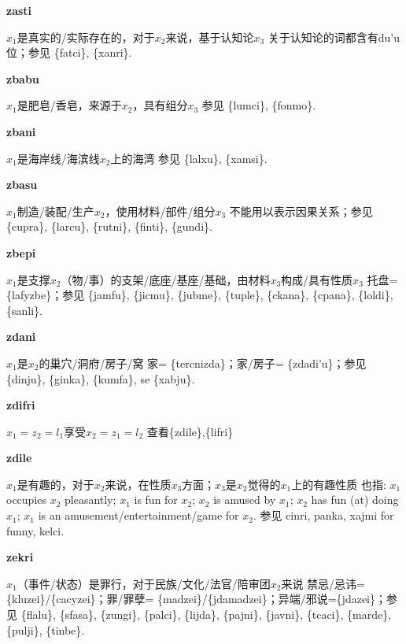 \documentclass[notitlepage,twocolumn,a4paper,10pt]{book}
\begin{document}
{\sffamily\bfseries zasti}\enspace {\ttfamily\bfseries[zat     za'i]}  $x_1$是真实的\slash{}实际存在的，对于$x_2$来说，基于认知论$x_3$ \textemdash{} 关于认知论的词都含有du'u位；参见 \{fatci\}, \{xanri\}.

{\sffamily\bfseries zbabu}\enspace {\ttfamily\bfseries[bab]}  $x_1$是肥皂\slash{}香皂，来源于$x_2$，具有组分$x_3$ \textemdash{} 参见 \{lumci\}, \{fonmo\}.

{\sffamily\bfseries zbani} $x_1$是海岸线\slash{}海滨线$x_2$上的海湾 \textemdash{} 参见 \{lalxu\}, \{xamsi\}.

{\sffamily\bfseries zbasu}\enspace {\ttfamily\bfseries[    zba]}  $x_1$制造\slash{}装配\slash{}生产$x_2$，使用材料\slash{}部件\slash{}组分$x_3$ \textemdash{} 不能用以表示因果关系；参见 \{cupra\}, \{larcu\}, \{rutni\}, \{finti\}, \{gundi\}.

{\sffamily\bfseries zbepi}\enspace {\ttfamily\bfseries[    zbe]}  $x_1$是支撑$x_2$（物\slash{}事）的支架\slash{}底座\slash{}基座\slash{}基础，由材料$x_3$构成\slash{}具有性质$x_3$ \textemdash{} 托盘= \{lafyzbe\}；参见 \{jamfu\}, \{jicmu\}, \{jubme\}, \{tuple\}, \{ckana\}, \{cpana\}, \{loldi\}, \{sanli\}.

{\sffamily\bfseries zdani}\enspace {\ttfamily\bfseries[    zda]}  $x_1$是$x_2$的巢穴\slash{}洞府\slash{}房子\slash{}窝 \textemdash{} 家= \{tercnizda\}；家\slash{}房子= \{zdadi'u\}；参见 \{dinju\}, \{ginka\}, \{kumfa\}, se \{xabju\}.

{\sffamily\bfseries zdifri} $x_1=z_2=l_1$享受$x_2=z_1=l_2$ \textemdash{} 查看\{zdile\},\{lifri\}

{\sffamily\bfseries zdile}\enspace {\ttfamily\bfseries[    zdi]}  $x_1$是有趣的，对于$x_2$来说，在性质$x_3$方面；$x_3$是$x_2$觉得的$x_1$上的有趣性质 \textemdash{} 也指: $x_1$ occupies $x_2$ pleasantly; $x_1$ is fun for $x_2$; $x_2$ is amused by $x_1$; $x_2$ has fun (at) doing $x_1$; $x_1$ is an amusement\slash{}entertainment\slash{}game for $x_2$. 参见 {cinri}, {panka}, {xajmi} for funny, {kelci}.

{\sffamily\bfseries zekri}  $x_1$（事件\slash{}状态）是罪行，对于民族\slash{}文化\slash{}法官\slash{}陪审团$x_2$来说 \textemdash{} 禁忌\slash{}忌讳=\{kluzei\}\slash{}\{cacyzei\}；罪\slash{}罪孽= \{madzei\}\slash{}\{jdamadzei\}；异端\slash{}邪说=\{jdazei\}；参见 \{flalu\}, \{sfasa\}, \{zungi\}, \{palci\}, \{lijda\}, \{pajni\}, \{javni\}, \{tcaci\}, \{marde\}, \{pulji\}, \{tinbe\}.
\end{document}

